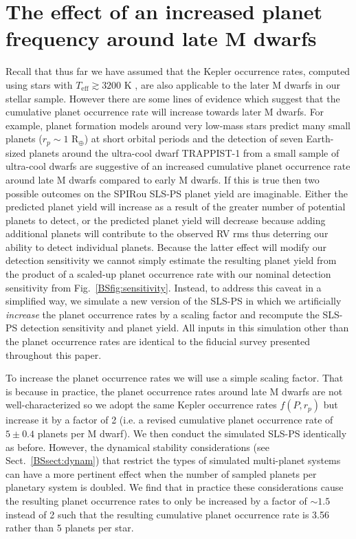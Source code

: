 \section{The effect of an increased planet frequency around late M dwarfs} \label{BSsect:2occ}
Recall that thus far we have assumed that the Kepler occurrence rates,
computed using stars with $T_{\text{eff}} \gtrsim 3200$ K \citep[i.e. spectral
  types of M4.5 and earlier;][]{luhman03}, are also applicable to the later
M dwarfs in our stellar sample. However there are some lines of evidence which
suggest that the cumulative planet occurrence rate will increase towards later M dwarfs.
For example, planet formation models around very
low-mass stars predict many small planets ($r_p \sim 1$ R$_{\oplus}$) at short
orbital periods \citep[e.g.][]{alibert13,alibert17} and the detection of seven
Earth-sized planets around the ultra-cool dwarf TRAPPIST-1 from a small sample
of ultra-cool dwarfs \citep{gillon17, luger17} are suggestive of an increased
cumulative planet occurrence rate around late M dwarfs compared to early
M dwarfs. If this is true then two possible outcomes on the SPIRou SLS-PS
planet yield are imaginable. Either the predicted planet yield will increase as a
result of the greater number of potential planets to detect, or the predicted
planet yield will decrease because adding additional planets will contribute to the
observed RV rms thus deterring our ability to detect individual planets.
Because the latter effect will modify our detection sensitivity we cannot simply estimate the
resulting planet yield from the product of a scaled-up planet occurrence rate with our nominal
detection sensitivity from Fig.~\ref{BSfig:sensitivity}. Instead, to address this
caveat in a simplified way, we simulate a new version of the SLS-PS 
in which we artificially \emph{increase} the planet occurrence rates by a scaling factor
and recompute the SLS-PS detection sensitivity and planet yield.
All inputs in this simulation other than the planet occurrence
rates are identical to the fiducial survey presented throughout this paper. 

To increase the planet occurrence rates we will use a simple scaling factor.
That is because in practice, the planet occurrence rates around late M dwarfs are not
well-characterized so we adopt the same Kepler occurrence rates $f(P,r_p)$
but increase it by a factor of 2 (i.e. a revised cumulative planet occurrence
rate of $5 \pm 0.4$ planets per M dwarf). We then conduct the simulated
SLS-PS identically as before. However, the dynamical stability considerations (see 
Sect.~\ref{BSsect:dynam}) that restrict the types of simulated multi-planet systems
can have a more pertinent effect when the number of sampled planets per planetary
system is doubled. We find that in practice these considerations cause the resulting planet
occurrence rates to only be increased by a factor of $\sim 1.5$ instead of 2
such that the resulting cumulative planet occurrence rate is 3.56 rather than 5
planets per star. 

